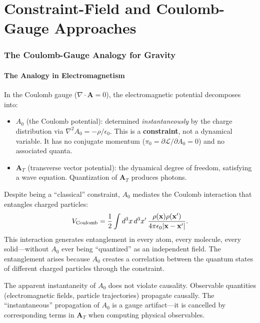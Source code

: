 \documentclass[12pt,a4paper]{article}
\begin{document}
\part{Constraint-Field and Coulomb-Gauge Approaches}

\section{The Coulomb-Gauge Analogy for Gravity}
\label{sec:coulomb-gauge}

\subsection{The Analogy in Electromagnetism}

In the Coulomb gauge ($\nabla \cdot \mathbf{A} = 0$), the electromagnetic potential decomposes into:
\begin{itemize}
\item $A_0$ (the Coulomb potential): determined \emph{instantaneously} by the charge distribution via $\nabla^2 A_0 = -\rho/\epsilon_0$. This is a \textbf{constraint}, not a dynamical variable. It has no conjugate momentum ($\pi_0 = \partial\mathcal{L}/\partial\dot{A}_0 = 0$) and no associated quanta.
\item $\mathbf{A}_T$ (transverse vector potential): the dynamical degree of freedom, satisfying a wave equation. Quantization of $\mathbf{A}_T$ produces photons.
\end{itemize}

Despite being a ``classical'' constraint, $A_0$ mediates the Coulomb interaction that entangles charged particles:
\begin{equation}
V_{\rm Coulomb} = \frac{1}{2}\int d^3x\,d^3x'\,\frac{\rho(\mathbf{x})\rho(\mathbf{x}')}{4\pi\epsilon_0|\mathbf{x}-\mathbf{x}'|}.
\end{equation}
This interaction generates entanglement in every atom, every molecule, every solid---without $A_0$ ever being ``quantized'' as an independent field. The entanglement arises because $A_0$ creates a correlation between the quantum states of different charged particles through the constraint.

The apparent instantaneity of $A_0$ does not violate causality. Observable quantities (electromagnetic fields, particle trajectories) propagate causally. The ``instantaneous'' propagation of $A_0$ is a gauge artifact---it is cancelled by corresponding terms in $\mathbf{A}_T$ when computing physical observables.
\end{document}
